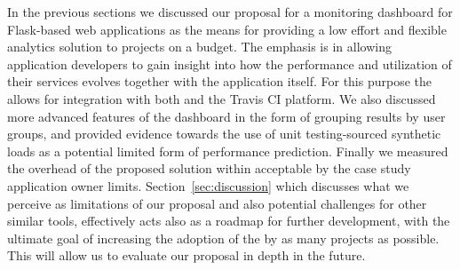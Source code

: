 \documentclass[conference]{IEEEtran}
\begin{document}
In the previous sections we discussed our proposal for a monitoring dashboard for Flask-based web applications as the means for providing a low effort and flexible analytics solution to projects on a budget. The emphasis is in allowing application developers to gain insight into how the performance and utilization of their services evolves together with the application itself. For this purpose the \tool allows for integration with both \git and the Travis CI platform. We also discussed more advanced features of the dashboard in the form of grouping results by user groups, and provided evidence towards the use of unit testing-sourced synthetic loads as a potential limited form of performance prediction. Finally we measured the overhead of the proposed solution within acceptable by the case study application owner limits. Section~\ref{sec:discussion} which discusses what we perceive as limitations of our proposal and also potential challenges for other similar tools, effectively acts also as a roadmap for further development, with the ultimate goal of increasing the adoption of the \tool by as many projects as possible. This will allow us to evaluate our proposal in depth in the future.


%
%



% 







\end{document}
